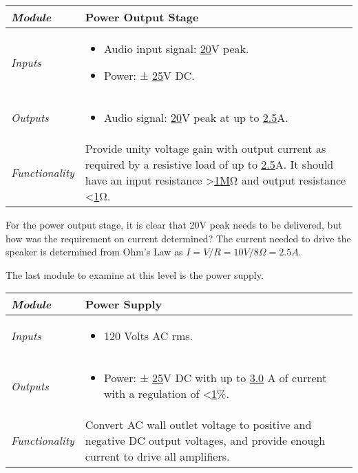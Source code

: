 \begin{table}
\label{table:level1HighGainAmp}
\begin{tabular}{|l|m{10cm}|}
\hline
\emph{Module} &
Power Output Stage  \\ \hline

\emph{Inputs} & 
\begin{itemize}
\item
  Audio input signal: \ul{20}V peak.
\item
  Power: ± \ul{25}V DC.
\end{itemize}\\ \hline
\emph{Outputs} & 
\begin{itemize}
\item
  Audio signal: \ul{20}V peak at up to \ul{2.5}A.
\end{itemize} \\ \hline
\emph{Functionality} & Provide unity voltage gain with output current as
required by a resistive load of up to \ul{2.5}A. It should have an input
resistance \textgreater{}\ul{1M}Ω and output resistance
\textless{}\ul{1}Ω. \\ \hline
\end{tabular}
\end{table}

For the power output stage, it is clear that 20V peak needs to be
delivered, but how was the requirement on current determined? The
current needed to drive the speaker is determined from Ohm's Law as
$I = V/R = 10V/8\Omega = 2.5A$.

The last module to examine at this level is the power supply.

\begin{table}
\label{table:level1HighGainAmp}
\begin{tabular}{|l|m{10cm}|}
\hline
\emph{Module} & Power Supply \\ \hline
\emph{Inputs} & 
\begin{itemize}
\item
  120 Volts AC rms.
\end{itemize} \\ \hline

\emph{Outputs} & 
\begin{itemize}
\item
  Power: ± \ul{25}V DC with up to \ul{3.0} A of current with a
  regulation of \textless{}\ul{1}\%.
\end{itemize}\\ \hline
\emph{Functionality} & Convert AC wall outlet voltage to positive and
negative DC output voltages, and provide enough current to drive all
amplifiers. \\ \hline
\end{tabular}
\end{table}



